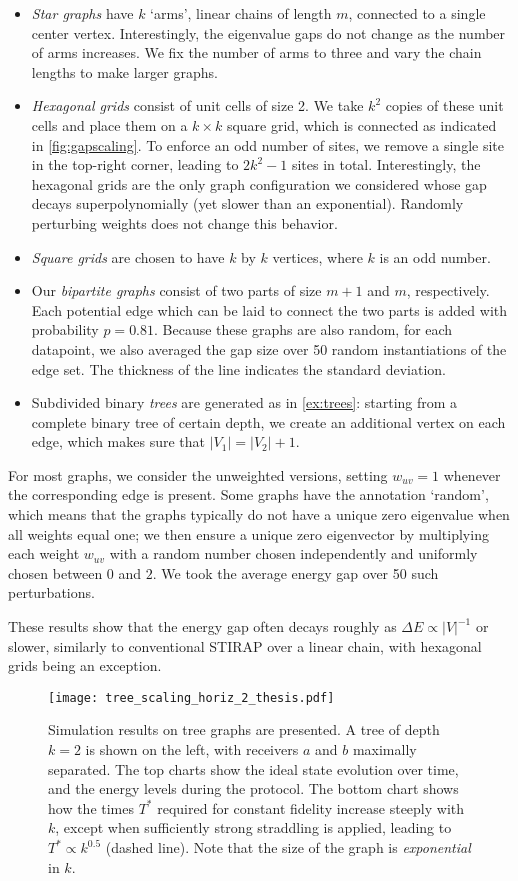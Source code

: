 \begin{itemize}
\item \emph{Star graphs} have $k$ `arms', linear chains of length $m$, connected to a single center vertex.  Interestingly, the eigenvalue gaps do not change as the number of arms increases. We fix the number of arms to three and vary the chain lengths to make larger graphs. 
\item \emph{Hexagonal grids} consist of unit cells of size 2. We take $k^2$ copies of these unit cells and place them on a $k\times k$ square grid, which is connected as indicated in \cref{fig:gapscaling}. To enforce an odd number of sites, we remove a single site in the top-right corner, leading to $2k^2 - 1$ sites in total. Interestingly, the hexagonal grids are the only graph configuration we considered whose gap decays superpolynomially (yet slower than an exponential). Randomly perturbing weights does not change this behavior. 
\item \emph{Square grids} are chosen to have $k$ by $k$ vertices, where $k$ is an odd number. 
\item Our \emph{bipartite graphs} consist of two parts of size $m+1$ and $m$, respectively. Each potential edge which can be laid to connect the two parts is added with probability $p=0.81$. Because these graphs are also random, for each datapoint, we also averaged the gap size over 50 random instantiations of the edge set. The thickness of the line indicates the standard deviation. 
\item Subdivided binary \emph{trees} are generated as in \cref{ex:trees}: starting from a complete binary tree of certain depth, we create an additional vertex on each edge, which makes sure that $|V_1| = |V_2| + 1$.
\end{itemize}
%
For most graphs, we consider the unweighted versions, setting $w_{uv} = 1$ whenever the corresponding edge is present. Some graphs have the annotation `random', which means that the graphs typically do not have a unique zero eigenvalue when all weights equal one; we then ensure a unique zero eigenvector by multiplying each weight $w_{uv}$ with a random number chosen independently and uniformly chosen between $0$ and $2$. We took the average energy gap over 50 such perturbations. 

These results show that the energy gap often decays roughly as $\Delta E \propto |V|^{-1}$ or slower, similarly to conventional STIRAP over a linear chain, with hexagonal grids being an exception. 


\begin{figure}
\centering
\texttt{[image: tree\_scaling\_horiz\_2\_thesis.pdf]}
%
%
\caption{Simulation results on tree graphs are presented.  A tree of depth $k=2$ is shown on the left, with receivers $a$ and $b$ maximally separated. The top charts show the ideal state evolution over time, and the energy levels during the protocol. The bottom chart shows how the times $T^*$ required for constant fidelity increase steeply with $k$, except when sufficiently strong straddling is applied, leading to $T^*\propto k^{0.5}$ (dashed line). Note that the size of the graph is \emph{exponential} in $k$.}
\label{fig:tree}
\end{figure}

